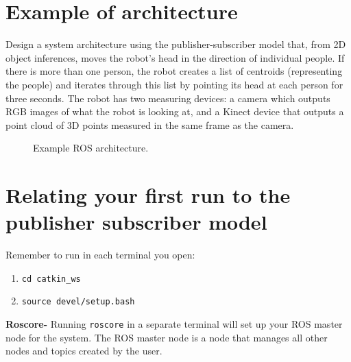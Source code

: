 \documentclass[11pt]{article}
\begin{document}
\section{Example of architecture}
Design a system architecture using the publisher-subscriber model that, from 2D object inferences, moves the robot's head in the direction of individual people. If there is more than one person, the robot creates a list of centroids (representing the people) and iterates through this list by pointing its head at each person for three seconds. The robot has two measuring devices: a camera which outputs RGB images of what the robot is looking at, and a Kinect device that outputs a point cloud of 3D points measured in the same frame as the camera.

\begin{figure}[ht]
\centering
{}
\caption{Example ROS architecture.}
\end{figure}

\section{Relating your first run to the publisher subscriber model}
Remember to run in each terminal you open:
\begin{enumerate}
\item \texttt{cd catkin\_ws}
\item \texttt{source devel/setup.bash}
\end{enumerate}

\textbf{Roscore-} Running \texttt{roscore} in a separate terminal will set up your ROS master node for the system. The ROS master node is a node that manages all other nodes and topics created by the user.
\end{document}
